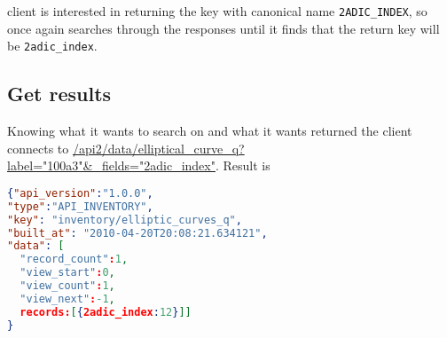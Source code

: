 \documentclass[11pt]{article}
\begin{document}
client is interested in returning the key with canonical name \texttt{2ADIC\_INDEX}, so once again searches through the responses until it finds that the return key will be \texttt{2adic\_index}.

\subsection{Get results}
Knowing what it wants to search on and what it wants returned the client connects to \url{/api2/data/elliptical_curve_q?label="100a3"&_fields="2adic\_index"}. Result is
\begin{lstlisting}[language=json,firstnumber=1]
{"api_version":"1.0.0",
"type":"API_INVENTORY",
"key": "inventory/elliptic_curves_q",
"built_at": "2010-04-20T20:08:21.634121",
"data": [
  "record_count":1,
  "view_start":0,
  "view_count":1,
  "view_next":-1,
  records:[{2adic_index:12}]]
}
\end{lstlisting}
\end{document}
